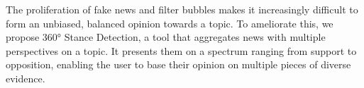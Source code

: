 The proliferation of fake news and filter bubbles makes it increasingly difficult to form an unbiased, balanced opinion towards a topic. To ameliorate this, we propose 360° Stance Detection, a tool that aggregates news with multiple perspectives on a topic. It presents them on a spectrum ranging from support to opposition, enabling the user to base their opinion on multiple pieces of diverse evidence.
